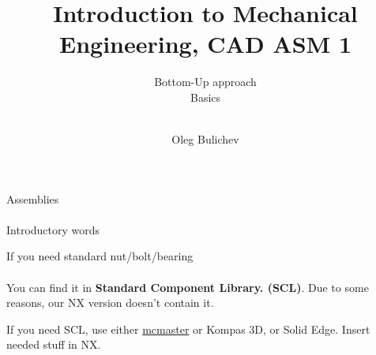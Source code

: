 \documentclass[aspectratio=169]{beamer}
\title[IME]{Introduction to Mechanical Engineering, CAD ASM 1} %
\subtitle{Bottom-Up approach
\\ Basics \\ \ 
         } %
\author{Oleg Bulichev}
\newcommand{\fbckg}[1]{\usebackgroundtemplate{\texttt{[image: \#1]}}}%
\begin{document}
\setlength{\abovedisplayskip}{0pt}
\setlength{\belowdisplayskip}{0pt}
\setlength{\abovedisplayshortskip}{0pt}
\setlength{\belowdisplayshortskip}{0pt}

\fbckg{fibeamer/figs/title_page.png}

\fbckg{fibeamer/figs/common.png}

\note{\scriptsize \begin{itemize}
        \item \
    \end{itemize}}

\note{
   \ 
}

\begin{frame}[c]{Assemblies}
\framesubtitle{}
    \centering
    \Huge
    Introductory words
\end{frame}

\begin{frame}[t]{If you need standard nut/bolt/bearing}
\framesubtitle{}
    You can find it in \textbf{Standard Component Library. (SCL)}. Due to some reasons, our NX version doesn't contain it.
    
    If you need SCL, use either \href{https://www.mcmaster.com/}{mcmaster} or Kompas 3D, or Solid Edge. Insert needed stuff in NX.
\end{frame}
\end{document}

